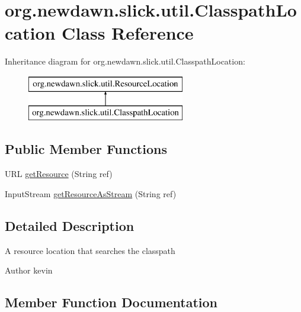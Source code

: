 \hypertarget{classorg_1_1newdawn_1_1slick_1_1util_1_1_classpath_location}{}\section{org.\+newdawn.\+slick.\+util.\+Classpath\+Location Class Reference}
\label{classorg_1_1newdawn_1_1slick_1_1util_1_1_classpath_location}
Inheritance diagram for org.\+newdawn.\+slick.\+util.\+Classpath\+Location\+:\begin{figure}[H]
\begin{center}
\leavevmode
\includegraphics[height=2.000000cm]{classorg_1_1newdawn_1_1slick_1_1util_1_1_classpath_location}
\end{center}
\end{figure}
\subsection*{Public Member Functions}
\begin{DoxyCompactItemize}
\item 
U\+RL \mbox{\hyperlink{classorg_1_1newdawn_1_1slick_1_1util_1_1_classpath_location_a4608719eee9b1ef3b90d7056f7064cde}{get\+Resource}} (String ref)
\item 
Input\+Stream \mbox{\hyperlink{classorg_1_1newdawn_1_1slick_1_1util_1_1_classpath_location_a452b5faed4fb19992109e2a1d9109ee4}{get\+Resource\+As\+Stream}} (String ref)
\end{DoxyCompactItemize}


\subsection{Detailed Description}
A resource location that searches the classpath

\begin{DoxyAuthor}{Author}
kevin 
\end{DoxyAuthor}


\subsection{Member Function Documentation}
\mbox{\label{classorg_1_1newdawn_1_1slick_1_1util_1_1_classpath_location_a4608719eee9b1ef3b90d7056f7064cde}} 
